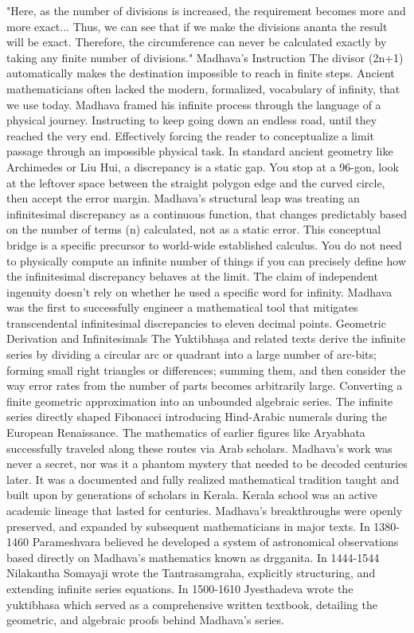 {"Here, as the number of divisions is increased, the requirement becomes more and more exact... Thus, we can see that if we make the divisions ananta the result will be exact. Therefore, the circumference can never be calculated exactly by taking any finite number of divisions."
Madhava’s Instruction
The divisor (2n+1) automatically makes the destination impossible to reach in finite steps. Ancient mathematicians often lacked the modern, formalized, vocabulary of infinity, that we use today. Madhava framed his infinite process through the language of a physical journey. Instructing to keep going down an endless road, until they reached the very end. Effectively forcing the reader to conceptualize a limit passage through an impossible physical task. In standard ancient geometry like Archimedes or Liu Hui, a discrepancy is a static gap. You stop at a 96-gon, look at the leftover space between the straight polygon edge and the curved circle, then accept the error margin. Madhava’s structural leap was treating an infinitesimal discrepancy as a continuous function, that changes predictably based on the number of terms (n) calculated, not as a static error. This conceptual bridge is a specific precursor to world-wide established calculus. You do not need to physically compute an infinite number of things if you can precisely define how the infinitesimal discrepancy behaves at the limit. The claim of independent ingenuity doesn't rely on whether he used a specific word for infinity. Madhava was the first to successfully engineer a mathematical tool that mitigates transcendental infinitesimal discrepancies to eleven decimal points. 
Geometric Derivation and Infinitesimals
The Yuktibhaṣa and related texts derive the infinite series by dividing a circular arc or quadrant into a large number of arc-bits; forming small right triangles or differences; summing them, and then consider the way error rates from the number of parts becomes arbitrarily large. Converting a finite geometric approximation into an unbounded algebraic series. The infinite series directly shaped Fibonacci introducing Hind-Arabic numerals during the European Renaissance. The mathematics of earlier figures like Aryabhata successfully traveled along these routes via Arab scholars. Madhava’s work was never a secret, nor was it a phantom mystery that needed to be decoded centuries later. It was a documented and fully realized mathematical tradition taught and built upon by generations of scholars in Kerala. 
Kerala school was an active academic lineage that lasted for centuries. Madhava’s breakthroughs were openly preserved, and expanded by subsequent mathematicians in major texts. In 1380-1460 Parameshvara believed he developed a system of astronomical observations based directly on Madhava’s mathematics known as drgganita. In 1444-1544 Nilakantha Somayaji wrote the Tantrasamgraha, explicitly structuring, and extending infinite series equations. In 1500-1610 Jyesthadeva wrote the yuktibhasa which served as a comprehensive written textbook, detailing the geometric, and algebraic proofs behind Madhava’s series.
}
